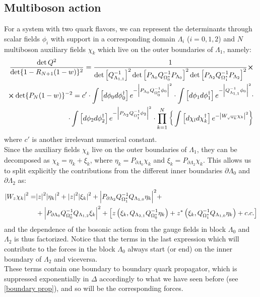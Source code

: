 \subsection{Multiboson action}
For a system with two quark flavors, we can represent the determinants through scalar fields $\phi_i$ \cite{Weingarten:1980hx} with support in a corresponding domain $\Lambda_i$ ($i = 0, 1, 2$) and $N$ multiboson auxiliary fields $\chi_k$ which live on the outer boundaries of $\Lambda_1$, namely:
\begin{equation}
    \begin{split}
        \frac{\det Q^2}{\det \{ 1 - R_{N+1}(1 - w) \}^2} = \frac{1}{\det \left[Q_{\Lambda_{1,1}}^{-1}\right]^2 \det \left[ P_{\Lambda_0} Q^{-1}_{\Omega^*_0} P_{\Lambda_0} \right]^2 \det \left[ P_{\Lambda_2} Q^{-1}_{\Omega^*_1} P_{\Lambda_2}  \right]^2} \cross \\
        \cross \det \{ P_N(1 - w) \}^{-2} = c' \cdot \int \left[d\phi_0 d\phi_0^\dagger \right] e^{-\abs{P_{\Lambda_0} Q_{\Omega_0^*}^{-1} \phi_0}^2} \cdot \int \left[d\phi_1 d\phi_1^\dagger \right] e^{-\abs{ Q_{\Lambda_{1,1}}^{-1} \phi_0}^2} \cdot \\
        \cdot \int \left[d\phi_2 d\phi_2^\dagger \right] e^{-\abs{P_{\Lambda_2} Q_{\Omega_1^*}^{-1} \phi_2}^2} \cdot \prod_{k = 1}^{N} \bigg\{  \int \left[d\chi_l d\chi_k^\dagger \right] e^{-\abs{ W_{\sqrt{u_k}} \chi_k }^2} \bigg\}
    \end{split}
\end{equation}
where $c'$ is another irrelevant numerical constant.
\\ Since the auxiliary fields $\chi_k$ live on the outer boundaries of $\Lambda_1$, they can be decomposed as $\chi_k = \eta_k + \xi_k$, where $\eta_k = P_{\partial\Lambda_0} \chi_k$ and $\xi_k = P_{\partial \Lambda_2} \chi_k$. This allows us to split explicitly the contributions from the different inner boundaries $\partial \Lambda_0$ and $\partial \Lambda_2$ as:
\begin{equation}
\begin{split}
     \abs{W_z \chi_k}^2 = & \abs{z}^2 \abs{\eta_k}^2 + \abs{z}^2 \abs{\xi_k}^2 + \abs{P_{\partial \Lambda_2} Q_{\Omega_1^*}^{-1} Q_{\Lambda_{1,0}} \eta_k }^2 + \\ & + \abs{P_{\partial \Lambda_0} Q_{\Omega_0^*}^{-1} Q_{\Lambda_{1,2}} \xi_k }^2 + \left[ z\left( \xi_k, Q_{\Lambda_{2,1}} Q_{\Omega_0^*}^{-1} \eta_k \right) + z^* \left(\xi_k, Q_{\Omega_1^*}^{-1} Q_{\Lambda_{1,0}} \eta_k \right) + c.c. \right]
\end{split}
\end{equation}
and the dependence of the bosonic action from the gauge fields in block $\Lambda_0$ and $\Lambda_2$ is thus factorized. Notice that the terms in the last expression which will contribute to the forces in the block $\Lambda_0$ always start (or end) on the inner boundary of $\Lambda_2$ and viceversa.
\\ These terms contain one boundary to boundary quark propagator, which is suppressed exponentially in $\Delta$ accordingly to what we have seen before (see \eqref{boundary prop}), and so will be the corresponding forces.

